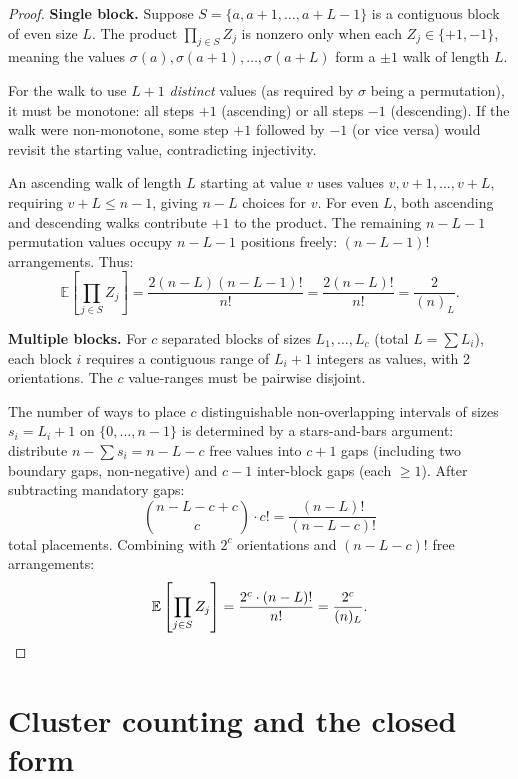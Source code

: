 \documentclass[11pt]{amsart}
\theoremstyle{definition}
\begin{document}
\begin{proof}
\textbf{Single block.} Suppose $S = \{a, a+1, \ldots, a+L-1\}$ is a contiguous block of even size $L$. The product $\prod_{j \in S} Z_j$ is nonzero only when each $Z_j \in \{+1,-1\}$, meaning the values $\sigma(a), \sigma(a+1), \ldots, \sigma(a+L)$ form a $\pm 1$ walk of length $L$.

For the walk to use $L+1$ \emph{distinct} values (as required by $\sigma$ being a permutation), it must be monotone: all steps $+1$ (ascending) or all steps $-1$ (descending). If the walk were non-monotone, some step $+1$ followed by $-1$ (or vice versa) would revisit the starting value, contradicting injectivity.

An ascending walk of length $L$ starting at value $v$ uses values $v, v+1, \ldots, v+L$, requiring $v + L \leq n-1$, giving $n-L$ choices for $v$. For even $L$, both ascending and descending walks contribute $+1$ to the product. The remaining $n-L-1$ permutation values occupy $n-L-1$ positions freely: $(n-L-1)!$ arrangements. Thus:
\[
\mathbb{E}\left[\prod_{j \in S} Z_j\right] = \frac{2(n-L)(n-L-1)!}{n!} = \frac{2(n-L)!}{n!} = \frac{2}{(n)_L}.
\]

\textbf{Multiple blocks.} For $c$ separated blocks of sizes $L_1, \ldots, L_c$ (total $L = \sum L_i$), each block $i$ requires a contiguous range of $L_i + 1$ integers as values, with 2 orientations. The $c$ value-ranges must be pairwise disjoint.

The number of ways to place $c$ distinguishable non-overlapping intervals of sizes $s_i = L_i + 1$ on $\{0, \ldots, n-1\}$ is determined by a stars-and-bars argument: distribute $n - \sum s_i = n - L - c$ free values into $c+1$ gaps (including two boundary gaps, non-negative) and $c-1$ inter-block gaps (each $\geq 1$). After subtracting mandatory gaps:
\[
\binom{n-L-c + c}{c} \cdot c! = \frac{(n-L)!}{(n-L-c)!}
\]
total placements. Combining with $2^c$ orientations and $(n-L-c)!$ free arrangements:
\[
\mathbb{E}\left[\prod_{j \in S} Z_j\right] = \frac{2^c \cdot (n-L)!}{n!} = \frac{2^c}{(n)_L}. \qedhere
\]
\end{proof}

\section{Cluster counting and the closed form}
\end{document}
